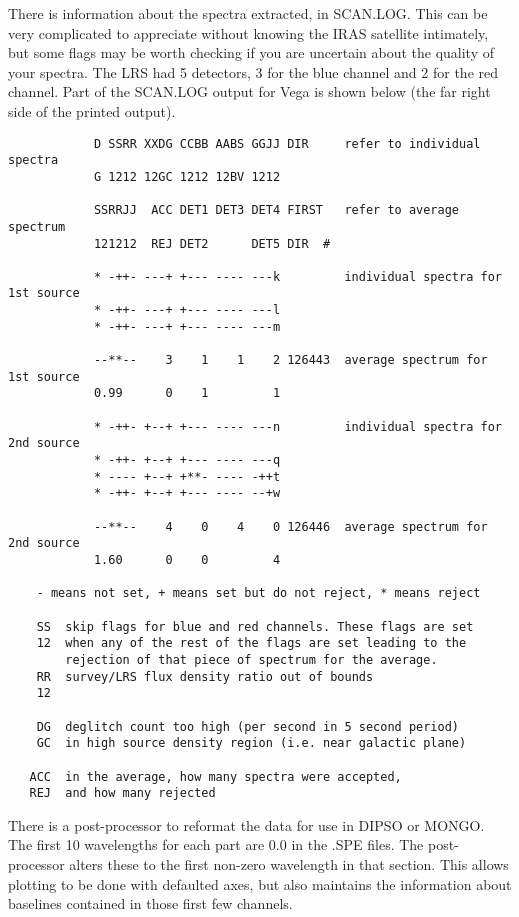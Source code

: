 There is information about the spectra extracted, in SCAN.LOG.
This can be very complicated to appreciate without knowing the IRAS satellite
intimately, but some flags may be worth checking if you are uncertain about
the quality of your spectra. 
The LRS had 5 detectors, 3 for the blue channel and 2 for the red channel.
Part of the SCAN.LOG output for Vega is shown below (the far right side of
the printed output).
\begin{verbatim}
            D SSRR XXDG CCBB AABS GGJJ DIR     refer to individual spectra
            G 1212 12GC 1212 12BV 1212

            SSRRJJ  ACC DET1 DET3 DET4 FIRST   refer to average spectrum
            121212  REJ DET2      DET5 DIR  #

            * -++- ---+ +--- ---- ---k         individual spectra for 1st source
            * -++- ---+ +--- ---- ---l
            * -++- ---+ +--- ---- ---m

            --**--    3    1    1    2 126443  average spectrum for 1st source
            0.99      0    1         1

            * -++- +--+ +--- ---- ---n         individual spectra for 2nd source
            * -++- +--+ +--- ---- ---q
            * ---- +--+ +**- ---- -++t
            * -++- +--+ +--- ---- --+w

            --**--    4    0    4    0 126446  average spectrum for 2nd source
            1.60      0    0         4

    - means not set, + means set but do not reject, * means reject

    SS  skip flags for blue and red channels. These flags are set
    12  when any of the rest of the flags are set leading to the 
        rejection of that piece of spectrum for the average.
    RR  survey/LRS flux density ratio out of bounds
    12  

    DG  deglitch count too high (per second in 5 second period)
    GC  in high source density region (i.e. near galactic plane)
 
   ACC  in the average, how many spectra were accepted,
   REJ  and how many rejected
\end{verbatim}
There is a post-processor to reformat the data for use in DIPSO or MONGO.
The first 10 wavelengths for each part are 0.0 in the .SPE files.
The post-processor alters these to the first non-zero wavelength in that 
section.
This allows plotting to be done with defaulted axes, but also maintains the
information about baselines contained in those first few channels.

